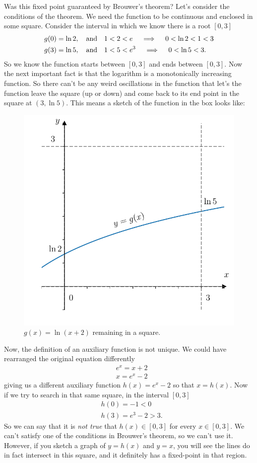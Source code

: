 {	Was this fixed point guaranteed by Brouwer's theorem? Let's consider the conditions of the theorem. We need the function to be continuous and enclosed in some square. Consider the interval in which we know there is a root $[0,3]$
	\begin{align*}
	& g(0) = \ln 2, \quad {\rm and} \quad 1 < 2 < e \quad \implies \quad 0 < \ln 2 < 1 < 3 \\
	& g(3) = \ln 5, \quad {\rm and} \quad 1 < 5 < e^3 \quad \implies \quad 0 < \ln 5 < 3.
	\end{align*}
	So we know the function starts between $[0,3]$ and ends between $[0,3]$. Now the next important fact is that the logarithm is a monotonically increasing function. So there can't be any weird oscillations in the function that let's the function leave the square (up or down) and come back to its end point in the square at $(3,\ln 5)$. This means a sketch of the function in the box looks like:
	\begin{figure}[H]
		\begin{center}
		\includegraphics[width=0.5\linewidth]{figures/ch2_brouwer2.pdf} 
		  \caption{$g(x) = \ln(x+2)$ remaining in a square.} \label{fig:ch2_brouwer2}
		\end{center}
	\end{figure}

	Now, the definition of an auxiliary function  is not unique. We could have rearranged the original equation differently
	\begin{align*}
	& e^x = x+ 2 \\
	& x = e^x - 2
	\end{align*}
	giving us a different auxiliary function $h(x) = e^x - 2$ so that $x=h(x)$. Now if we try to search in that same square, in the interval $[0,3]$
	\begin{align*}
	& h(0) = - 1 < 0 \\
	& h(3) = e^3 - 2 > 3.
	\end{align*}
	So we can say that it is \textit{not true} that $h(x)\in[0,3]$ for every $x\in[0,3]$. We can't satisfy one of the conditions in Brouwer's theorem, so we can't use it. However, if you sketch a graph of $y=h(x)$ and $y=x$, you will see the lines do in fact intersect in this square, and it definitely has a fixed-point in that region.
}{\downline}


